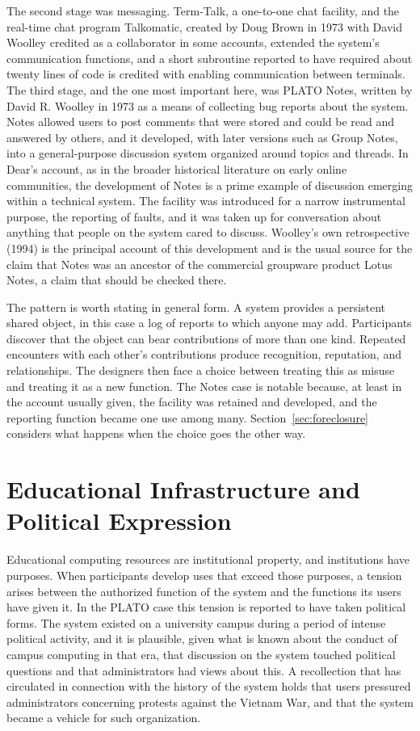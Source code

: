 \documentclass[11pt]{article}
\theoremstyle{remark}
\begin{document}
The second stage was messaging. Term-Talk, a one-to-one chat facility, and the real-time chat program Talkomatic, created by Doug Brown in 1973 with David Woolley credited as a collaborator in some accounts, extended the system's communication functions, and a short subroutine reported to have required about twenty lines of code is credited with enabling communication between terminals. The third stage, and the one most important here, was PLATO Notes, written by David R. Woolley in 1973 as a means of collecting bug reports about the system. Notes allowed users to post comments that were stored and could be read and answered by others, and it developed, with later versions such as Group Notes, into a general-purpose discussion system organized around topics and threads. In Dear's account, as in the broader historical literature on early online communities, the development of Notes is a prime example of discussion emerging within a technical system. The facility was introduced for a narrow instrumental purpose, the reporting of faults, and it was taken up for conversation about anything that people on the system cared to discuss. Woolley's own retrospective (1994) is the principal account of this development and is the usual source for the claim that Notes was an ancestor of the commercial groupware product Lotus Notes, a claim that should be checked there.

The pattern is worth stating in general form. A system provides a persistent shared object, in this case a log of reports to which anyone may add. Participants discover that the object can bear contributions of more than one kind. Repeated encounters with each other's contributions produce recognition, reputation, and relationships. The designers then face a choice between treating this as misuse and treating it as a new function. The Notes case is notable because, at least in the account usually given, the facility was retained and developed, and the reporting function became one use among many. Section~\ref{sec:foreclosure} considers what happens when the choice goes the other way.

\section{Educational Infrastructure and Political Expression}

Educational computing resources are institutional property, and institutions have purposes. When participants develop uses that exceed those purposes, a tension arises between the authorized function of the system and the functions its users have given it. In the PLATO case this tension is reported to have taken political forms. The system existed on a university campus during a period of intense political activity, and it is plausible, given what is known about the conduct of campus computing in that era, that discussion on the system touched political questions and that administrators had views about this. A recollection that has circulated in connection with the history of the system holds that users pressured administrators concerning protests against the Vietnam War, and that the system became a vehicle for such organization.
\end{document}
